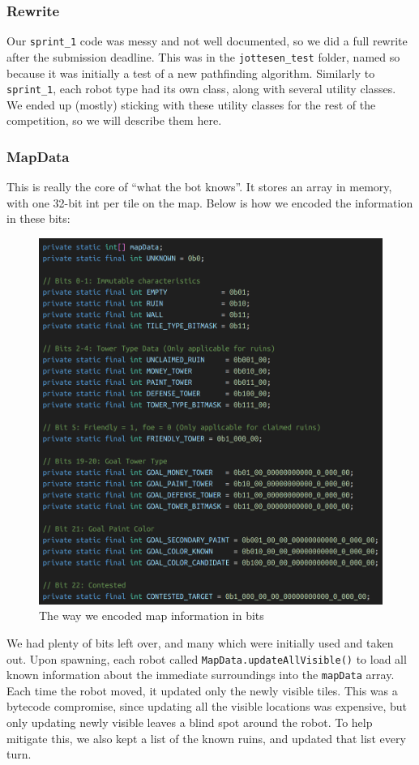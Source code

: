 \subsubsection{Rewrite}

Our \verb|sprint_1| code was messy and not well documented, so we did a full rewrite after the submission deadline. This was in the \verb|jottesen_test| folder, named so because it was initially a test of a new pathfinding algorithm. Similarly to \verb|sprint_1|, each robot type had its own class, along with several utility classes. We ended up (mostly) sticking with these utility classes for the rest of the competition, so we will describe them here.

\subsubsection{MapData}

This is really the core of ``what the bot knows''. It stores an array in memory, with one 32-bit int per tile on the map. Below is how we encoded the information in these bits:
\begin{figure}[H]
  \centering
  \includegraphics[scale=0.25]{images/mapData_bits.png}
  \caption{The way we encoded map information in bits}
\end{figure}
We had plenty of bits left over, and many which were initially used and taken out. Upon spawning, each robot called \verb|MapData.updateAllVisible()| to load all known information about the immediate surroundings into the \verb|mapData| array. Each time the robot moved, it updated only the newly visible tiles. This was a bytecode compromise, since updating all the visible locations was expensive, but only updating newly visible leaves a blind spot around the robot. To help mitigate this, we also kept a list of the known ruins, and updated that list every turn.

